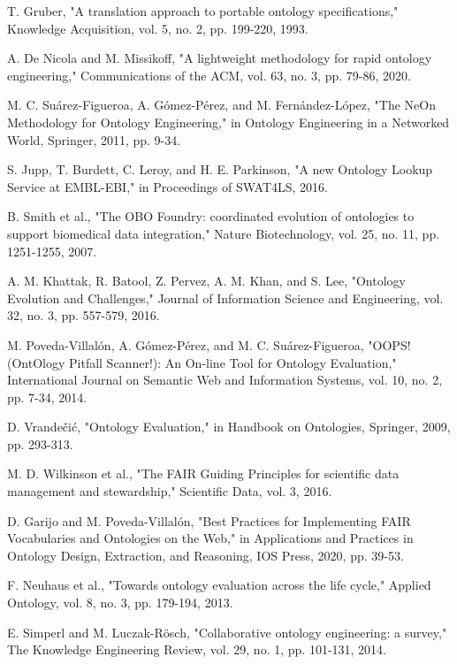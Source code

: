 \documentclass[conference]{IEEEtran}
\begin{document}
\begin{thebibliography}{00}
 T. Gruber, "A translation approach to portable ontology specifications," Knowledge Acquisition, vol. 5, no. 2, pp. 199-220, 1993.

 A. De Nicola and M. Missikoff, "A lightweight methodology for rapid ontology engineering," Communications of the ACM, vol. 63, no. 3, pp. 79-86, 2020.

 M. C. Suárez-Figueroa, A. Gómez-Pérez, and M. Fernández-López, "The NeOn Methodology for Ontology Engineering," in Ontology Engineering in a Networked World, Springer, 2011, pp. 9-34.

 S. Jupp, T. Burdett, C. Leroy, and H. E. Parkinson, "A new Ontology Lookup Service at EMBL-EBI," in Proceedings of SWAT4LS, 2016.

 B. Smith et al., "The OBO Foundry: coordinated evolution of ontologies to support biomedical data integration," Nature Biotechnology, vol. 25, no. 11, pp. 1251-1255, 2007.

 A. M. Khattak, R. Batool, Z. Pervez, A. M. Khan, and S. Lee, "Ontology Evolution and Challenges," Journal of Information Science and Engineering, vol. 32, no. 3, pp. 557-579, 2016.

 M. Poveda-Villalón, A. Gómez-Pérez, and M. C. Suárez-Figueroa, "OOPS! (OntOlogy Pitfall Scanner!): An On-line Tool for Ontology Evaluation," International Journal on Semantic Web and Information Systems, vol. 10, no. 2, pp. 7-34, 2014.

 D. Vrandečić, "Ontology Evaluation," in Handbook on Ontologies, Springer, 2009, pp. 293-313.

 M. D. Wilkinson et al., "The FAIR Guiding Principles for scientific data management and stewardship," Scientific Data, vol. 3, 2016.

 D. Garijo and M. Poveda-Villalón, "Best Practices for Implementing FAIR Vocabularies and Ontologies on the Web," in Applications and Practices in Ontology Design, Extraction, and Reasoning, IOS Press, 2020, pp. 39-53.

 F. Neuhaus et al., "Towards ontology evaluation across the life cycle," Applied Ontology, vol. 8, no. 3, pp. 179-194, 2013.

 E. Simperl and M. Luczak-Rösch, "Collaborative ontology engineering: a survey," The Knowledge Engineering Review, vol. 29, no. 1, pp. 101-131, 2014.

\end{thebibliography}
\end{document}
